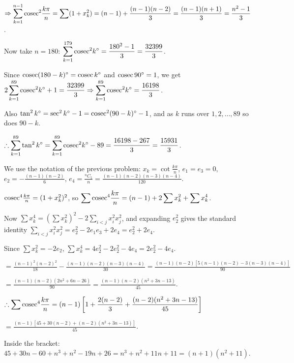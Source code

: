   $\Rightarrow \displaystyle\sum_{k = 1}^{n - 1}{\rm cosec}^2\frac{k\pi}{n} = \sum(1 + x_k^2) = (n - 1)
  + \frac{(n - 1)(n - 2)}{3} = \frac{(n - 1)(n + 1)}{3} = \frac{n^2 - 1}{3}$.

  Now take $n = 180$: $\displaystyle\sum_{k = 1}^{179}{\rm cosec}^2k^\circ = \frac{180^2 - 1}{3}
  = \frac{32399}{3}$.

  Since ${\rm cosec}(180 - k)^\circ = {\rm cosec}\,k^\circ$ and ${\rm cosec}\,90^\circ = 1$, we get
  $2\displaystyle\sum_{k = 1}^{89}{\rm cosec}^2k^\circ + 1 = \frac{32399}{3}\Rightarrow \sum_{k = 1}^{89}{\rm
    cosec}^2k^\circ = \frac{16198}{3}$.

  Also $\tan^2k^\circ = \sec^2k^\circ - 1 = {\rm cosec}^2(90 - k)^\circ - 1$, and as $k$ runs over $1, 2,
  \ldots, 89$ so does $90 - k$.

  $\therefore \displaystyle\sum_{k = 1}^{89}\tan^2k^\circ = \sum_{k = 1}^{89}{\rm cosec}^2k^\circ - 89
  = \frac{16198 - 267}{3} = \frac{15931}{3}$.
\item We use the notation of the previous problem: $x_k = \cot\frac{k\pi}{n}$, $e_1 = e_3 = 0$, $e_2 =
  -\frac{(n - 1)(n - 2)}{6}$, $e_4 = \frac{{}^nC_5}{n} = \frac{(n - 1)(n - 2)(n - 3)(n - 4)}{120}$.

  ${\rm cosec}^4\frac{k\pi}{n} = (1 + x_k^2)^2$, so $\displaystyle\sum{\rm cosec}^4\frac{k\pi}{n} = (n - 1)
  + 2\sum x_k^2 + \sum x_k^4$.

  Now $\displaystyle\sum x_k^4 = \left(\sum x_k^2\right)^2 - 2\sum_{i < j}x_i^2x_j^2$, and expanding $e_2^2$ gives
  the standard identity $\displaystyle\sum_{i < j}x_i^2x_j^2 = e_2^2 - 2e_1e_3 + 2e_4 = e_2^2 + 2e_4$.

  Since $\sum x_k^2 = -2e_2$, $\displaystyle\sum x_k^4 = 4e_2^2 - 2e_2^2 - 4e_4 = 2e_2^2 - 4e_4$.

  $= \frac{(n - 1)^2(n - 2)^2}{18} - \frac{(n - 1)(n - 2)(n - 3)(n - 4)}{30} = \frac{(n - 1)(n - 2)[5(n - 1)(n
    - 2) - 3(n - 3)(n - 4)]}{90}$

  $= \frac{(n - 1)(n - 2)(2n^2 + 6n - 26)}{90} = \frac{(n - 1)(n - 2)(n^2 + 3n - 13)}{45}$.

  $\therefore \displaystyle\sum{\rm cosec}^4\frac{k\pi}{n} = (n - 1)\left[1 + \frac{2(n - 2)}{3} + \frac{(n -
    2)(n^2 + 3n - 13)}{45}\right]$

  $= \frac{(n - 1)[45 + 30(n - 2) + (n - 2)(n^2 + 3n - 13)]}{45}$.

  Inside the bracket: $45 + 30n - 60 + n^3 + n^2 - 19n + 26 = n^3 + n^2 + 11n + 11 = (n + 1)(n^2 + 11)$.


